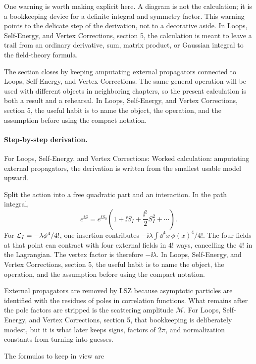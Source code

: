 One warning is worth making explicit here.  A diagram is not the calculation; it is a bookkeeping device for a definite integral and symmetry factor.  This warning points to the delicate step of the derivation, not to a decorative aside.  In Loops, Self-Energy, and Vertex Corrections, section 5, the calculation is meant to leave a trail from an ordinary derivative, sum, matrix product, or Gaussian integral to the field-theory formula.

The section closes by keeping amputating external propagators connected to Loops, Self-Energy, and Vertex Corrections.  The same general operation will be used with different objects in neighboring chapters, so the present calculation is both a result and a rehearsal.  In Loops, Self-Energy, and Vertex Corrections, section 5, the useful habit is to name the object, the operation, and the assumption before using the compact notation.



\paragraph{Step-by-step derivation.}

For Loops, Self-Energy, and Vertex Corrections: Worked calculation: amputating external propagators, the derivation is written from the smallest usable model upward.

Split the action into a free quadratic part and an interaction.  In the path integral,
\[
  e^{\ii S}=e^{\ii S_0}\left(1+\ii S_I+\frac{\ii^2}{2}S_I^2+\cdots\right).
\]
For \(\mathcal L_I=-\lambda\phi^4/4!\), one insertion contributes \(-\ii\lambda\int\dd^4x\,\phi(x)^4/4!\).  The four fields at that point can contract with four external fields in \(4!\) ways, cancelling the \(4!\) in the Lagrangian.  The vertex factor is therefore \(-\ii\lambda\).  In Loops, Self-Energy, and Vertex Corrections, section 5, the useful habit is to name the object, the operation, and the assumption before using the compact notation.

External propagators are removed by LSZ because asymptotic particles are identified with the residues of poles in correlation functions.  What remains after the pole factors are stripped is the scattering amplitude \(\mathcal M\).  For Loops, Self-Energy, and Vertex Corrections, section 5, that bookkeeping is deliberately modest, but it is what later keeps signs, factors of \(2\pi\), and normalization constants from turning into guesses.

The formulas to keep in view are

